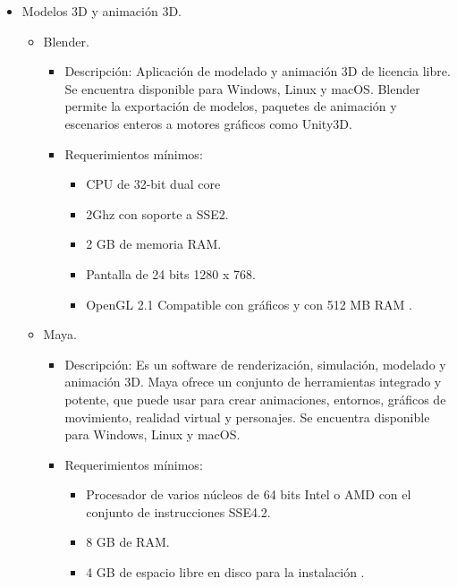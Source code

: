 \begin{itemize}
\begin{itemize}
\begin{itemize}
\begin{itemize}
							\end{itemize}
					\end{itemize}
			\end{itemize}
		\item Modelos 3D y animación 3D.
			\begin{itemize}
				\item Blender.
					\begin{itemize}
						\item Descripción: Aplicación de modelado y animación 3D de 
						licencia libre. Se encuentra disponible para Windows, Linux y 
						macOS. Blender permite la exportación de modelos, paquetes de 
						animación y escenarios enteros a motores gráficos como Unity3D.
						\item Requerimientos mínimos:
							\begin{itemize}
								\item CPU de 32-bit dual core 								
								\item 2Ghz  con soporte a SSE2.
								\item 2 GB de memoria RAM.
								\item Pantalla de 24 bits 1280 x 768.
								\item OpenGL 2.1 Compatible con gráficos y con 512 MB 
								RAM \cite{Ref:Blender}.
							\end{itemize}
					\end{itemize}
				\item Maya.
					\begin{itemize}
						\item Descripción: Es un software de renderización, simulación, 
						modelado y animación 3D. Maya ofrece un conjunto de herramientas 
						integrado y potente, que puede usar para crear animaciones, 
						entornos, gráficos de movimiento, realidad virtual y personajes. 
						Se encuentra disponible para Windows, Linux y macOS.
						\item Requerimientos mínimos:
							\begin{itemize}
								\item Procesador de varios núcleos de 64 bits Intel o 
								AMD con el conjunto de instrucciones SSE4.2.
								\item 8 GB de RAM.
								\item 4 GB de espacio libre en disco para la 
								instalación \cite{Ref:Maya}.
							\end{itemize}

\end{itemize}
\end{itemize}
\end{itemize}
